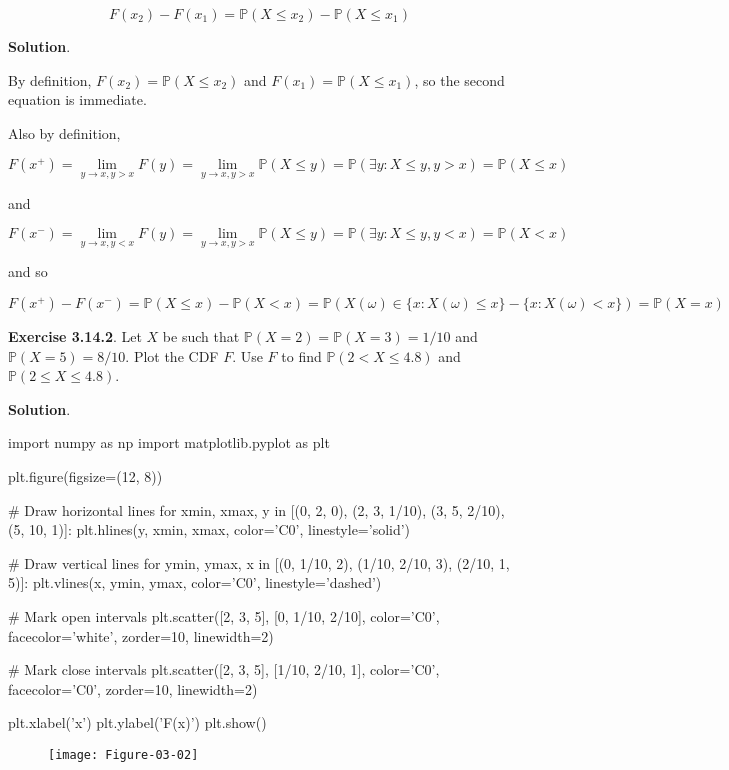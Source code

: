 \[ F(x_{2}) - F(x_{1}) = \mathbb{P}(X \leq x_{2}) - \mathbb{P}(X \leq x_{1}) \]

\textbf{Solution}.

By definition, \(F(x_{2}) = \mathbb{P}(X \leq x_{2})\) and
\(F(x_{1}) = \mathbb{P}(X \leq x_{1})\), so the second equation is
immediate.

Also by definition,

\[ F(x^+) = \lim_{y \rightarrow x, y > x} F(y) = \lim_{y \rightarrow x, y > x} \mathbb{P}(X \leq y) 
= \mathbb{P}(\exists y : X \leq y, y > x) 
= \mathbb{P}(X \leq x) \]

and

\[ F(x^-) = \lim_{y \rightarrow x, y < x} F(y) = \lim_{y \rightarrow x, y > x} \mathbb{P}(X \leq y) 
= \mathbb{P}(\exists y : X \leq y, y < x)
= \mathbb{P}(X < x)
\]

and so

\[ F(x^+) - F(x^-) = \mathbb{P}(X \leq x) - \mathbb{P}(X < x) = \mathbb{P}(X(\omega) \in \{x : X(\omega) \leq x \} - \{x: X(\omega) < x \}) = \mathbb{P}(X = x)\]

\textbf{Exercise 3.14.2}. Let \(X\) be such that
\(\mathbb{P}(X = 2) = \mathbb{P}(X = 3) = 1/10\) and
\(\mathbb{P}(X = 5) = 8/10\). Plot the CDF \(F\). Use \(F\) to find
\(\mathbb{P}(2 < X \leq 4.8)\) and \(\mathbb{P}(2 \leq X \leq 4.8)\).

\textbf{Solution}.

\begin{python}
import numpy as np
import matplotlib.pyplot as plt

plt.figure(figsize=(12, 8))

# Draw horizontal lines
for xmin, xmax, y in [(0, 2, 0), (2, 3, 1/10), (3, 5, 2/10), (5, 10, 1)]:
    plt.hlines(y, xmin, xmax, color='C0', linestyle='solid')
    
# Draw vertical lines
for ymin, ymax, x in [(0, 1/10, 2), (1/10, 2/10, 3), (2/10, 1, 5)]:
    plt.vlines(x, ymin, ymax, color='C0', linestyle='dashed')
    
# Mark open intervals
plt.scatter([2, 3, 5], [0, 1/10, 2/10], color='C0', facecolor='white', zorder=10, linewidth=2)

# Mark close intervals
plt.scatter([2, 3, 5], [1/10, 2/10, 1], color='C0', facecolor='C0', zorder=10, linewidth=2)

plt.xlabel('x')
plt.ylabel('F(x)')
plt.show()
\end{python}

\begin{figure}[H]
\centering
\texttt{[image: Figure-03-02]}
\end{figure}

